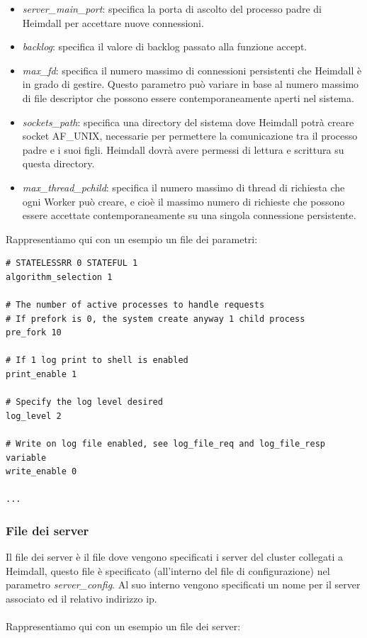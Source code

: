 \documentclass[italian]{tktltiki2}
\begin{document}
\begin{itemize}
	\item \emph{server\_main\_port}: specifica la porta di ascolto del processo padre di Heimdall per accettare nuove connessioni.
			
	\item \emph{backlog}: specifica il valore di backlog passato alla funzione accept.
	
	\item \emph{max\_fd}: specifica il numero massimo di connessioni persistenti che Heimdall è in grado di gestire. Questo parametro può variare in base al numero massimo di file descriptor che possono essere contemporaneamente aperti nel sistema.
	
	\item \emph{sockets\_path}: specifica una directory del sistema dove Heimdall potrà creare socket AF\_UNIX, necessarie per permettere la comunicazione tra il processo padre e i suoi figli. Heimdall dovrà avere permessi di lettura e scrittura su questa directory.
	
	\item \emph{max\_thread\_pchild}: specifica il numero massimo di thread di richiesta che ogni Worker può creare, e cioè il massimo numero di richieste che possono essere accettate contemporaneamente su una singola connessione persistente.
\end{itemize}
Rappresentiamo qui con un esempio un file dei parametri:

\begin{lstlisting}
# STATELESSRR 0 STATEFUL 1
algorithm_selection 1

# The number of active processes to handle requests
# If prefork is 0, the system create anyway 1 child process
pre_fork 10

# If 1 log print to shell is enabled
print_enable 1

# Specify the log level desired
log_level 2

# Write on log file enabled, see log_file_req and log_file_resp variable
write_enable 0

...
\end{lstlisting}

\subsubsection{File dei server}
\label{ssec:config_server}
Il file dei server è il file dove vengono specificati i server del cluster collegati a Heimdall, questo file è specificato (all'interno del file di configurazione) nel parametro \emph{server\_config}. Al suo interno vengono specificati un nome per il server associato ed il relativo indirizzo ip.
\\
\\
Rappresentiamo qui con un esempio un file dei server:
\end{document}
